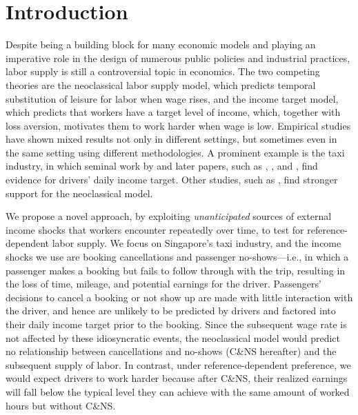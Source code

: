 \documentclass[reviewmode]{restat}
\begin{document}
\maketitle



\section{Introduction}
\label{sec:intro}

Despite being a building block for many economic models and playing an imperative role in the 
design of numerous public policies and industrial practices, labor supply is still a controversial 
topic in economics. The two competing theories are the neoclassical labor supply model, which 
predicts temporal substitution of leisure for labor when wage rises, and the income target model, 
which predicts that workers have a target level of income, which, together with loss aversion, 
motivates them to work harder when wage is low. Empirical studies have shown mixed results not 
only in different settings, but sometimes even in the same setting using different methodologies.
A prominent example is the taxi industry, in which seminal work by \citet{camerer1997labor} and 
later papers, such as \citet{crawford2011new}, \citet{martin2017quit}, and \citet{thakral2018daily}, 
find evidence for drivers' daily income target. Other studies, such as 
\citet{farber2005tomorrow,farber2015you}, find stronger support for the neoclassical model.


We propose a novel approach, by exploiting \textit{unanticipated} sources of external 
income shocks that workers encounter repeatedly over time, to test for reference-dependent labor supply.
We focus on Singapore's taxi industry, and the income shocks we use are 
booking cancellations and passenger no-shows---i.e., in which a passenger makes a booking but fails 
to follow through with the trip, resulting in the loss of time, mileage, and potential earnings %
 for the driver. Passengers' decisions to cancel a booking or not show up are made with 
little interaction with the driver, and hence are unlikely to be predicted by drivers and factored 
into their daily income target prior to the booking. Since the subsequent wage rate is not affected 
by these idiosyncratic events, the neoclassical model would predict no relationship between cancellations 
and no-shows (C\&NS hereafter) and the subsequent supply of labor. In contrast, under reference-dependent 
preference, we would expect drivers to work harder because after C\&NS, their realized earnings will fall 
below the typical level they can achieve with the same amount of worked hours but without C\&NS. 
\end{document}
